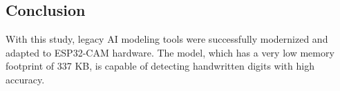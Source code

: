 \subsection{Conclusion}
With this study, legacy AI modeling tools were successfully modernized and adapted to ESP32-CAM hardware. The model, which has a very low memory footprint of 337 KB, is capable of detecting handwritten digits with high accuracy.
